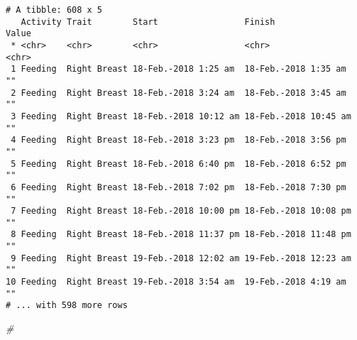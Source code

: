 \documentclass[10,portrait]{article}
\newenvironment{Shaded}{\begin{snugshade}}{\end{snugshade}}
\newcommand{\CommentTok}[1]{\textcolor[rgb]{0.56,0.35,0.01}{\textit{#1}}}
\begin{document}
\begin{verbatim}
# A tibble: 608 x 5
   Activity Trait        Start                 Finish                Value
 * <chr>    <chr>        <chr>                 <chr>                 <chr>
 1 Feeding  Right Breast 18-Feb.-2018 1:25 am  18-Feb.-2018 1:35 am  ""   
 2 Feeding  Right Breast 18-Feb.-2018 3:24 am  18-Feb.-2018 3:45 am  ""   
 3 Feeding  Right Breast 18-Feb.-2018 10:12 am 18-Feb.-2018 10:45 am ""   
 4 Feeding  Right Breast 18-Feb.-2018 3:23 pm  18-Feb.-2018 3:56 pm  ""   
 5 Feeding  Right Breast 18-Feb.-2018 6:40 pm  18-Feb.-2018 6:52 pm  ""   
 6 Feeding  Right Breast 18-Feb.-2018 7:02 pm  18-Feb.-2018 7:30 pm  ""   
 7 Feeding  Right Breast 18-Feb.-2018 10:00 pm 18-Feb.-2018 10:08 pm ""   
 8 Feeding  Right Breast 18-Feb.-2018 11:37 pm 18-Feb.-2018 11:48 pm ""   
 9 Feeding  Right Breast 19-Feb.-2018 12:02 am 19-Feb.-2018 12:23 am ""   
10 Feeding  Right Breast 19-Feb.-2018 3:54 am  19-Feb.-2018 4:19 am  ""   
# ... with 598 more rows
\end{verbatim}

\begin{Shaded}
\begin{Highlighting}[]
\CommentTok{# }
\end{Highlighting}
\end{Shaded}

\printbibliography
\end{document}
